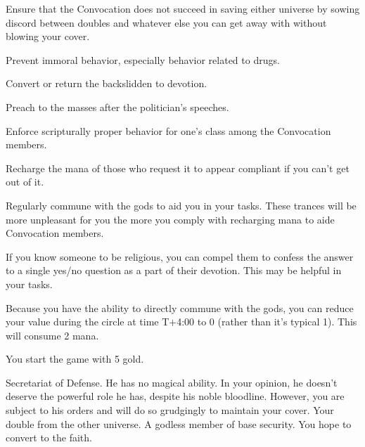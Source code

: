 \documentclass[char]{guildcamp3}
\begin{document}
\begin{itemz}[Goals]
  \item Ensure that the Convocation does not succeed in saving either universe by sowing discord between doubles and whatever else you can get away with without blowing your cover.
  \item Prevent immoral behavior, especially behavior related to drugs.
  \item Convert or return the backslidden to devotion.
  \item Preach to the masses after the politician's speeches.
  \item Enforce scripturally proper behavior for one's class among the Convocation members.
  \item Recharge the mana of those who request it to appear compliant if you can't get out of it.
  \item Regularly commune with the gods to aid you in your tasks. These trances will be more unpleasant for you the more you comply with recharging mana to aide Convocation members.
\end{itemz}

\begin{itemz}[Notes]
  \item If you know someone to be religious, you can compel them to confess the answer to a single yes/no question as a part of their devotion. This may be helpful in your tasks.
  \item Because you have the ability to directly commune with the gods, you can reduce your value during the circle at time T+4:00 to 0 (rather than it's typical 1). This will consume 2 mana. 
  \item You start the game with 5 gold. 
\end{itemz}


\begin{contacts}
  \contact{\cNobleOne{}} Secretariat of Defense. He has no magical ability. In your opinion, he doesn't deserve the powerful role he has, despite his noble bloodline. However, you are subject to his orders and will do so grudgingly to maintain your cover.
  \contact{\cSpecOpTwo{}} Your double from the other universe. A godless member of base security. You hope to convert \cSpecOpTwo{\them} to the faith.
\end{contacts}
\end{document}
